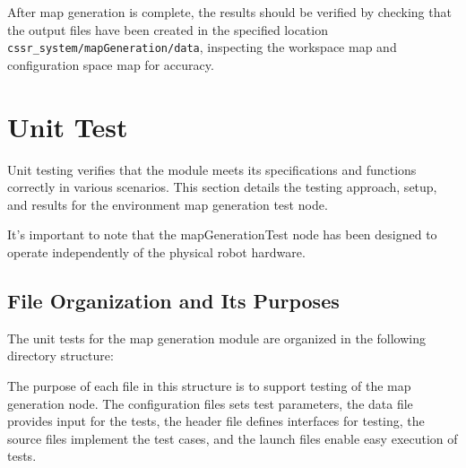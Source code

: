 \documentclass{CSSRforAfrica}
\renewcommand{\DTstyle}{\footnotesize\sffamily}
\begin{document}
After map generation is complete, the results should be verified by checking that the output files have been created in the specified location \texttt{cssr\_system/mapGeneration/data}, inspecting the workspace map and configuration space map for accuracy.

\newpage

\section{Unit Test}
Unit testing verifies that the module meets its specifications and functions correctly in various scenarios. This section details the testing approach, setup, and results for the environment map generation test node. 

\noindent It's important to note that the mapGenerationTest node has been designed to operate independently of the physical robot hardware.

\subsection{File Organization and Its Purposes}

The unit tests for the map generation module are organized in the following directory structure:

\vspace*{0.5em}

\renewcommand*\DTstyle{\ttfamily}

\noindent The purpose of each file in this structure is to support testing of the map generation node. The configuration files sets test parameters, the data file provides input for the tests, the header file defines interfaces for testing, the source files implement the test cases, and the launch files enable easy execution of tests.
\end{document}
